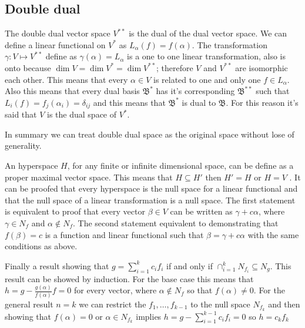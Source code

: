 \documentclass[../../../main.tex]{subfiles}
\begin{document}
\subsection{Double dual}
The double dual vector space $V^{**}$ is the dual of the dual vector space. We can define a linear functional on $V^*$ as $L_\alpha(f)=f(\alpha)$. The transformation $\gamma:V\mapsto V^{**}$ define as $\gamma(\alpha)=L_\alpha$ is a one to one linear transformation, also is onto because $\dim V = \dim V^* = \dim V^{**}$; therefore $V$ and $V^{**}$ are isomorphic each other. This means that every $\alpha\in V$ is related to one and only one $f\in L_\alpha$. Also this means that every dual basis $\mathfrak{B}^*$ has it's corresponding $\mathfrak{B}^{**}$ such that $L_i(f)=f_j(\alpha_i)=\delta_{ij}$ and this means that $\mathfrak{B}^*$ is dual to $\mathfrak{B}$. For this reason it's said that $V$ is the dual space of $V^*$.

In summary we can treat double dual space as the original space without lose of generality.

An hyperspace $H$, for any finite or infinite dimensional space, can be define as a proper maximal vector space. This means that $H\subseteq H'$ then $H'=H$ or $H=V$ . It can be proofed that every hyperspace is the null space for a linear functional and that the null space of a linear transformation is a null space. The first statement is equivalent to proof that every vector $\beta\in V$ can be written as $\gamma + c\alpha$, where $\gamma\in N_f$ and $\alpha\not\in N_f$. The second statement equivalent to demonstrating that $f(\beta)=c$ is a function and linear functional such that $\beta = \gamma + c\alpha$ with the same conditions as above.

Finally a result showing that $g=\sum_{i=1}^k c_i f_i$ if and only if $\cap_{i=1}^k N_{f_i} \subseteq N_g$. This result can be showed by induction. For the base case this means that $h=g-\frac{g(\alpha)}{f(\alpha)}f=0$  for every vector, where $\alpha\notin N_f$ so that $f(\alpha)\neq 0$. For the general result $n=k$ we can restrict the $f_1,\dots,f_{k-1}$ to the null space $N_{f_k}$ and then showing that $f(\alpha)=0$ or $\alpha\in N_{f_k}$ implies $h=g-\sum_{i=1}^{k-1} c_i f_i = 0$ so $h = c_k f_k$
\end{document}

